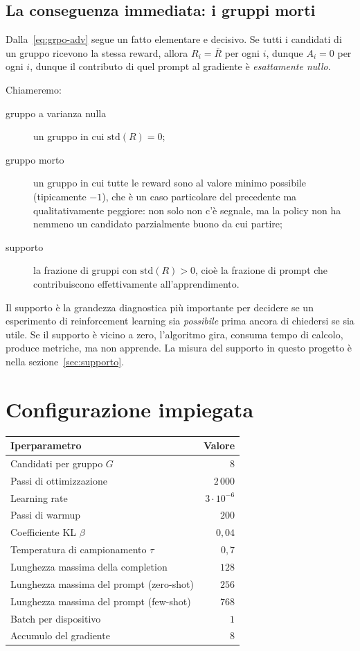 \subsection{La conseguenza immediata: i gruppi morti}
\label{sec:gruppi-morti}

Dalla~\eqref{eq:grpo-adv} segue un fatto elementare e decisivo. Se tutti i
candidati di un gruppo ricevono la stessa reward, allora
$R_i = \bar{R}$ per ogni $i$, dunque $A_i = 0$ per ogni $i$, dunque il
contributo di quel prompt al gradiente è \emph{esattamente nullo}.

Chiameremo:
\begin{description}
  \item[gruppo a varianza nulla] un gruppo in cui $\mathrm{std}(R) = 0$;
  \item[gruppo morto] un gruppo in cui tutte le reward sono al valore minimo
        possibile (tipicamente $-1$), che è un caso particolare del precedente
        ma qualitativamente peggiore: non solo non c'è segnale, ma la policy non
        ha nemmeno un candidato parzialmente buono da cui partire;
  \item[supporto] la frazione di gruppi con $\mathrm{std}(R) > 0$, cioè la
        frazione di prompt che contribuiscono effettivamente all'apprendimento.
\end{description}

Il supporto è la grandezza diagnostica più importante per decidere se un
esperimento di reinforcement learning sia \emph{possibile} prima ancora di
chiedersi se sia utile. Se il supporto è vicino a zero, l'algoritmo gira, consuma
tempo di calcolo, produce metriche, ma non apprende. La misura del supporto in
questo progetto è nella sezione~\ref{sec:supporto}.

\section{Configurazione impiegata}

\begin{center}
\begin{tabular}{lr}
\toprule
Iperparametro & Valore \\
\midrule
Candidati per gruppo $G$ & $8$ \\
Passi di ottimizzazione & $2\,000$ \\
Learning rate & $3 \cdot 10^{-6}$ \\
Passi di warmup & $200$ \\
Coefficiente KL $\beta$ & $0{,}04$ \\
Temperatura di campionamento $\tau$ & $0{,}7$ \\
Lunghezza massima della completion & $128$ \\
Lunghezza massima del prompt (zero-shot) & $256$ \\
Lunghezza massima del prompt (few-shot) & $768$ \\
Batch per dispositivo & $1$ \\
Accumulo del gradiente & $8$ \\
\bottomrule
\end{tabular}
\end{center}

